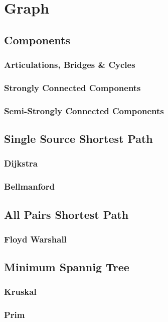 \documentclass[10pt,a4paper]{report}
\begin{document}
\chapter{Graph}
	
	\section{Components}
		\subsection{Articulations, Bridges \& Cycles}
		\subsection{Strongly Connected Components}
		\subsection{Semi-Strongly Connected Components}
	
	\section{Single Source Shortest Path}
		\subsection{Dijkstra}
		\subsection{Bellmanford}
		
	\section{All Pairs Shortest Path}
		\subsection{Floyd Warshall}
		
	\section{Minimum Spannig Tree}
		\subsection{Kruskal}
		\subsection{Prim}
		
\end{document}
